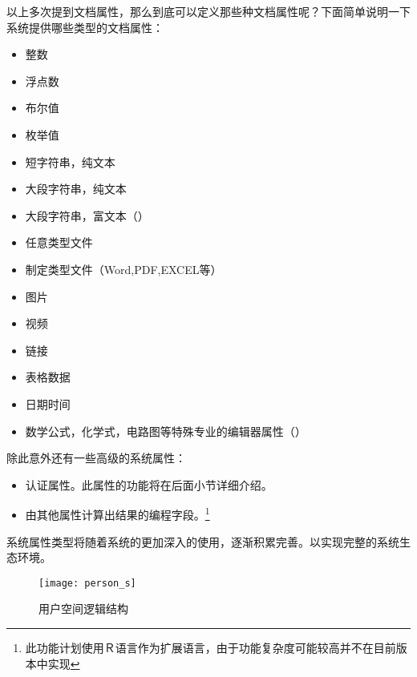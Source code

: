 以上多次提到文档属性，那么到底可以定义那些种文档属性呢？下面简单说明一下系统提供哪些类型的文档属性：
\begin{itemize}
\item 整数
\item 浮点数
\item 布尔值
\item 枚举值
\item 短字符串，纯文本
\item 大段字符串，纯文本
\item 大段字符串，富文本（\smarkdown）
\item 任意类型文件
\item 制定类型文件（Word,PDF,EXCEL等）
\item 图片
\item 视频
\item 链接
\item 表格数据
\item 日期时间
\item 数学公式，化学式，电路图等特殊专业的编辑器属性（）
\end{itemize}
除此意外还有一些高级的系统属性：
\begin{itemize}
\item 认证属性。此属性的功能将在后面小节详细介绍。
\item 由其他属性计算出结果的编程字段。\footnote{此功能计划使用Ｒ语言作为扩展语言，由于功能复杂度可能较高并不在目前版本中实现}
\end{itemize}
系统属性类型将随着系统的更加深入的使用，逐渐积累完善。以实现完整的系统生态环境。
\begin{figure}[H]
  \centering
  \texttt{[image: person\_s]}
  \caption{用户空间逻辑结构}
  \label{fig:xfig11}
\end{figure}

